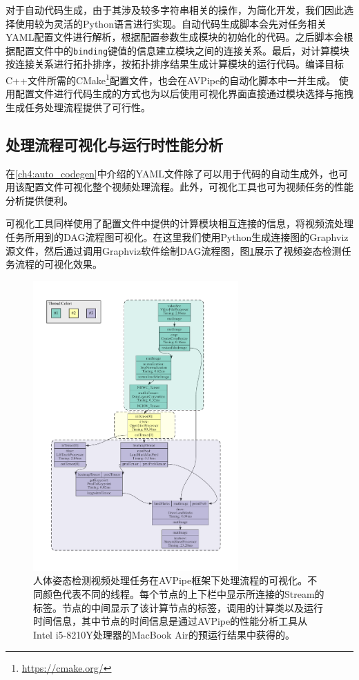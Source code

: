 对于自动代码生成，由于其涉及较多字符串相关的操作，为简化开发，我们因此选择使用较为灵活的Python语言进行实现。自动代码生成脚本会先对任务相关YAML配置文件进行解析，根据配置参数生成模块的初始化的代码。之后脚本会根据配置文件中的\texttt{binding}键值的信息建立模块之间的连接关系。最后，对计算模块按连接关系进行拓扑排序，按拓扑排序结果生成计算模块的运行代码。编译目标C++文件所需的CMake\footnote{\url{https://cmake.org/}}配置文件，也会在AVPipe的自动化脚本中一并生成。
使用配置文件进行代码生成的方式也为以后使用可视化界面直接通过模块选择与拖拽生成任务处理流程提供了可行性。

\subsection{处理流程可视化与运行时性能分析}\label{ch4:viz_prof}
在\ref{ch4:auto_codegen}中介绍的YAML文件除了可以用于代码的自动生成外，也可用该配置文件可视化整个视频处理流程。此外，可视化工具也可为视频任务的性能分析提供便利。\par

可视化工具同样使用了配置文件中提供的计算模块相互连接的信息，将视频流处理任务所用到的DAG流程图可视化。在这里我们使用Python生成连接图的Graphviz\cite{Gansner00anopen}源文件，然后通过调用Graphviz软件绘制DAG流程图，图\ref{fig:pose_dag}展示了视频姿态检测任务流程的可视化效果。\par

\begin{figure}[tb]
    \centering
    \includegraphics[width=0.7\textwidth]{figure/AVP_pose_estimation.pdf}
    \caption[AVPipe可视化DAG流程图的示例]{人体姿态检测视频处理任务在AVPipe框架下处理流程的可视化。不同颜色代表不同的线程。每个节点的上下栏中显示所连接的Stream的标签。节点的中间显示了该计算节点的标签，调用的计算类以及运行时间信息，其中节点的时间信息是通过AVPipe的性能分析工具从Intel i5-8210Y处理器的MacBook Air的预运行结果中获得的。}
    \label{fig:pose_dag}
\end{figure}

